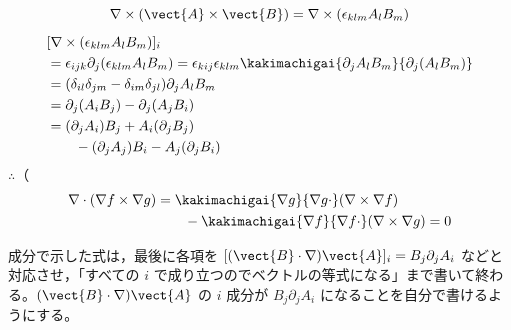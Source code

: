 \[ \nabla\times(\vect{A}\times\vect{B})=\nabla\times(\epsilon_{klm}A_{l}B_{m}) \]
\begin{align*}
&[\nabla\times(\epsilon_{klm}A_{l}B_{m})]_{i}\\
&=\epsilon_{ijk}\partial_{j}(\epsilon_{klm}A_{l}B_{m})=\epsilon_{kij}\epsilon_{klm}\kakimachigai{\partial_{j}A_{l}B_{m}}{\partial_{j}(A_{l}B_{m})}\\
&=(\delta_{il}\delta_{jm}-\delta_{im}\delta_{jl})\partial_{j}A_{l}B_{m}\\
&=\partial_{j}(A_{i}B_{j})-\partial_{j}(A_{j}B_{i})\\
&=(\partial_{j}A_{i})B_{j}+A_{i}(\partial_{j}B_{j})\\
&\qquad-(\partial_{j}A_{j})B_{i}-A_{j}(\partial_{j}B_{i})
\end{align*}
$\therefore$（
\begin{align*}
\nabla\cdot(\nabla f\times\nabla g)&=\kakimachigai{\nabla g}{\nabla g\cdot}(\nabla\times\nabla f)\\
&\qquad-\kakimachigai{\nabla f}{\nabla f\cdot}(\nabla\times\nabla g)=0
\end{align*}
\item 成分で示した式は，最後に各項を $[(\vect{B}\cdot\nabla)\vect{A}]_{i}=B_{j}\partial_{j}A_{i}$ などと対応させ，「すべての $i$ で成り立つのでベクトルの等式になる」まで書いて終わる。$(\vect{B}\cdot\nabla)\vect{A}$ の $i$ 成分が $B_{j}\partial_{j}A_{i}$ になることを自分で書けるようにする。
